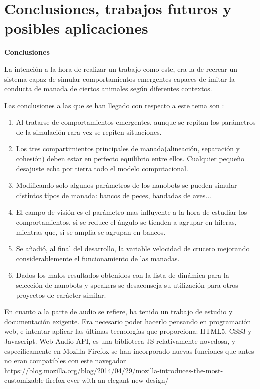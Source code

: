 \section{Conclusiones, trabajos futuros y posibles aplicaciones}
\label{section:conclusiones}
\noindent\textbf{Conclusiones}

La intención a la hora de realizar un trabajo como este, era la de recrear un sistema  capaz de simular comportamientos emergentes capaces de imitar la conducta de manada de ciertos animales según diferentes contextos. 

Las conclusiones a las que se han llegado con respecto a este tema son : 
\begin{enumerate}
 \item Al tratarse de comportamientos emergentes, aunque se repitan los parámetros de la simulación rara vez se repiten situaciones.
 \item Los tres compartimientos principales de manada(alineación, separación y cohesión) deben estar en perfecto equilibrio entre ellos. Cualquier pequeño desajuste echa por tierra todo el modelo computacional. 
 \item Modificando solo algunos parámetros de los nanobots se pueden simular distintos tipos de manada: bancos de peces, bandadas de aves...
 \item El campo de visión es el parámetro mas influyente a la hora de estudiar los comportamientos, si se reduce el ángulo se tienden a agrupar en hileras, mientras que, si se amplia se agrupan en bancos.   
 \item Se añadió, al final del desarrollo, la variable velocidad de crucero mejorando considerablemente el funcionamiento de las manadas.
 \item Dados los malos resultados obtenidos con la lista de dinámica para la selección de nanobots y speakers se desaconseja su utilización para otros proyectos de carácter similar.
\end{enumerate}

En cuanto a la parte de audio se refiere, ha tenido un trabajo de estudio y documentación
exigente. Era necesario poder hacerlo pensando en programación web, e intentar aplicar las
últimas tecnologías que proporciona: HTML5, CSS3 y Javascript.
Web Audio API, es una biblioteca JS relativamente novedosa, y específicamente en Mozilla
Firefox se han incorporado nuevas funciones que antes no eran compatibles con este
navegador
https://blog.mozilla.org/blog/2014/04/29/mozilla-introduces-the-most-
customizable-firefox-ever-with-an-elegant-new-design/
\\

